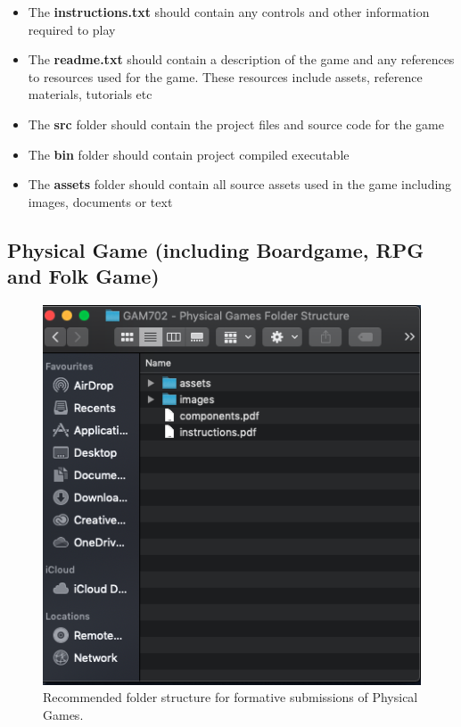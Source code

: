 \documentclass{../../fal_assignment}
\begin{document}
\begin{itemize}
	\item The \textbf{instructions.txt} should contain any controls and other information required to play
	\item The \textbf{readme.txt} should contain a description of the game and any references to resources used for the game. These resources include assets, reference materials, tutorials etc
	\item The \textbf{src} folder should contain the project files and source code for the game
	\item The \textbf{bin} folder should contain project compiled executable
	\item The \textbf{assets} folder should contain all source assets used in the game including images, documents or text
\end{itemize}

\pagebreak
\pagebreak
\subsection*{Physical Game (including Boardgame, RPG and Folk Game)} 

\begin{figure}[H]
	\begin{center}
		\includegraphics[height=0.4\textheight]{physical_games_folder_structure}
	\end{center}
	\caption{Recommended folder structure for formative submissions of Physical Games.}
	\label{fig:phyical_game_folder_structure}
\end{figure}
\end{document}
